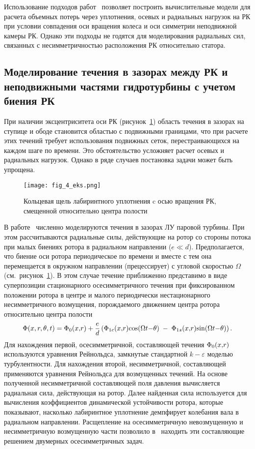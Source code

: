 Использование подходов работ~\cite{staubli, roy_vu} позволяет построить вычислительные модели для расчета 
объемных потерь через уплотнения, осевых и радиальных нагрузок на РК при условии совпадения оси вращения 
колеса и оси симметрии неподвижной камеры РК. Однако эти подходы не годятся для моделирования радиальных сил, 
связанных с несимметричностью расположения РК относительно статора.

\subsection{Моделирование течения в зазорах между РК и неподвижными 
            частями гидротурбины с учетом биения РК} \label{s:324}
При наличии эксцентриситета оси РК (рисунок~\ref{fig3:6}) область течения в зазорах на ступице и ободе 
становится областью с подвижными границами, что при расчете этих течений требует использования подвижных 
сеток, перестраивающихся на каждом шаге по времени. Это обстоятельство усложняет расчет осевых
и радиальных нагрузок. Однако в ряде случаев постановка задачи может быть упрощена.
\begin{figure}[b!]
  \centering
  \texttt{[image: fig\_4\_eks.png]}
  \caption{Кольцевая щель лабиринтного уплотнения c осью вращения РК, смещенной относительно центра полости}
  \label{fig3:6}
\end{figure}

В работе~\cite{xi_rhode} численно моделируются течения в зазорах ЛУ паровой турбины. 
При этом рассчитываются радиальные силы, действующие на ротор со стороны потока при малых биениях ротора в 
радиальном направлении ($e \ll d$). Предполагается, что биение оси ротора периодическое по времени и вместе с
тем она перемещается в окружном направлении (прецессирует) с угловой скоростью $\Omega$ 
(см.~рисунок~\ref{fig3:6}). В этом случае течение приближенно представимо в виде
суперпозиции стационарного осесимметричного течения при фиксированном положении ротора в центре 
и малого периодически нестационарного несимметричного возмущения, 
порождаемого движением центра ротора относительно центра полости
\begin{equation*}
  \Phi {\rm{(}}x,r,\theta ,t{\rm{)}} = \Phi_0 {\rm{(}}x{\rm{,}}r{\rm{)}} +
  \frac{e}{d}\left( {\Phi _{1c} {\rm{(}}x{\rm{,}}r{\rm{)cos(}}\Omega t{\rm{ - }}
  \theta {\rm{)}}\,{\kern 1pt}  - \;\Phi _{1s} {\rm{(}}x{\rm{,}}r{\rm{)sin(}}\Omega t{\rm{ - }}
  \theta {\rm{)}}} \right).
\end{equation*}
Для нахождения первой, осесимметричной, составляющей 
течения $\Phi _0 {\rm{(}}x{\rm{,}}r{\rm{)}}$ используются уравнения Рейнольдса, замкнутые
стандартной $k-\varepsilon$ моделью турбулентности. Для нахождения второй, несимметричной, 
составляющей применяются уравнения Рейнольдса для возмущенных течений.
На основе полученной несимметричной составляющей поля давления вычисляется радиальная сила, действующая 
на ротор. Далее найденная сила используется для вычисления коэффициентов динамической устойчивости ротора, 
которые показывают, насколько лабиринтное уплотнение демпфирует колебания вала в радиальном
направлении. Расщепление на осесимметричную невозмущенную и несимметричную возмущенную части позволило 
в~\cite{xi_rhode} находить эти составляющие решением двумерных осесимметричных задач.

